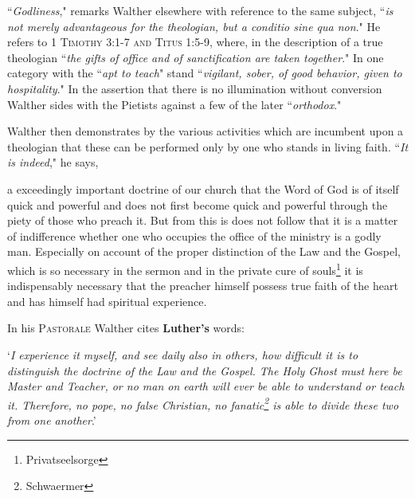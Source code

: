 ``\textit{Godliness}," remarks Walther elsewhere with reference to the same subject, ``\textit{is not merely advantageous for the theologian, but a conditio sine qua non}." He refers to {\scriptsize\textsc{1 Timothy 3:1-7 and Titus 1:5-9}}, where, in the description of a true theologian ``\textit{the gifts of office and of sanctification are taken together}." In one category with the ``\textit{apt to teach}" stand ``\textit{vigilant, sober, of good behavior, given to hospitality}." In the assertion that there is no illumination without conversion Walther sides with the Pietists against a few of the later ``\textit{orthodox}."

Walther then demonstrates by the various activities which are incumbent upon a theologian that these can be performed only by one who stands in living faith. ``\textit{It is indeed}," he says, \begin{fancyquotes}a exceedingly important doctrine of our church that the Word of God is of itself quick and powerful and does not first become quick and powerful through the piety of those who preach it. But from this is does not follow that it is a matter of indifference whether one who occupies the office of the ministry is a godly man. Especially on account of the proper distinction of the Law and the Gospel, which is so necessary in the sermon and in the private cure of souls\footnote{Privatseelsorge} it is indispensably necessary that the preacher himself possess true faith of the heart and has himself had spiritual experience.\end{fancyquotes}

In his \textsc{Pastorale} Walther cites \textbf{Luther's} words: \begin{displayquote}`\textit{I experience it myself, and see daily also in others, how difficult it is to distinguish the doctrine of the Law and the Gospel. The Holy Ghost must here be Master and Teacher, or no man on earth will ever be able to understand or teach it. Therefore, no pope, no false Christian, no fanatic\footnote{Schwaermer} is able to divide these two from one another}.'\end{displayquote}

